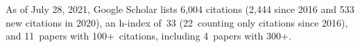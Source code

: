 %
As of July 28, 2021, Google Scholar lists
6,004 citations (2,444 since 2016 and 533 new citations in 2020),
an h-index of~33 (22~counting only citations since 2016),
and 11~papers with 100+~citations, including 4~papers with 300+.
